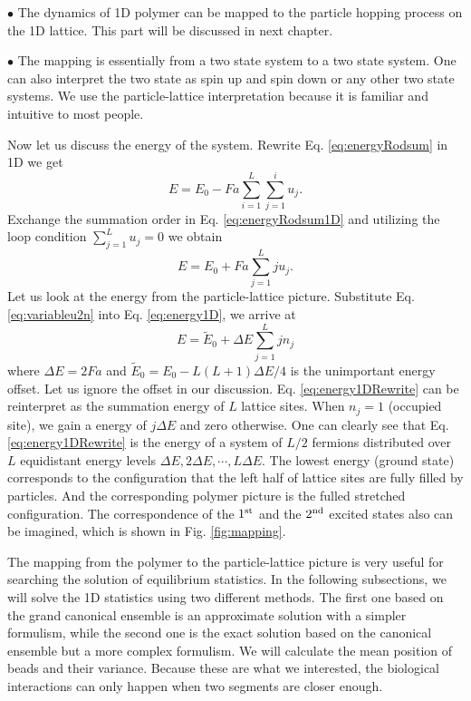 $\bullet$ The dynamics of 1D polymer can be mapped to the particle hopping process on the 1D lattice. This part will be discussed in next chapter.

$\bullet$ The mapping is essentially from a two state system to a two state system. One can also interpret the two state as spin up and spin down or any other two state systems. We use the particle-lattice interpretation because it is familiar and intuitive to most people. 

Now let us discuss the energy of the system. Rewrite Eq. \eqref{eq:energyRodsum} in 1D we get
\begin{equation}
    \label{eq:energyRodsum1D}
    E = E_0 - Fa \sum_{i=1}^L\sum_{j=1}^i u_j.
\end{equation}
Exchange the summation order in Eq. \eqref{eq:energyRodsum1D} and utilizing the loop condition $\sum_{j=1}^L u_j = 0$ we obtain
\begin{equation}
    \label{eq:energy1D}
    E = E_0 + Fa \sum_{j=1}^L j u_j.
\end{equation}
Let us look at the energy from the particle-lattice picture. Substitute Eq. \eqref{eq:variableu2n} into Eq. \eqref{eq:energy1D}, we arrive at
\begin{equation}
    \label{eq:energy1DRewrite}
    E = \tilde{E}_0+\Delta E\sum_{j=1}^{L} j n_j 
\end{equation}
where $\Delta E = 2Fa$ and $\tilde{E}_0 = E_0 - L(L+1)\Delta E/4$ is the unimportant energy offset. Let us ignore the offset in our discussion. Eq. \eqref{eq:energy1DRewrite} can be reinterpret as the summation energy of $L$ lattice sites. When $n_j = 1$ (occupied site), we gain a energy of $j\Delta E$ and zero otherwise. One can clearly see that Eq. \eqref{eq:energy1DRewrite} is the energy of a system of $L/2$ fermions distributed over $L$ equidistant energy levels $\Delta E, 2\Delta E, \cdots, L\Delta E$.
The lowest energy (ground state) corresponds to the configuration that the left half of lattice sites are fully filled by particles. And the corresponding polymer picture is the fulled stretched configuration. The correspondence of the $1^{\rm{st}}$ and the $2^{\rm{nd}}$ excited states also can be imagined, which is shown in Fig. \ref{fig:mapping}. 

The mapping from the polymer to the particle-lattice picture is very useful for searching the solution of equilibrium statistics. In the following subsections, we will solve the 1D statistics using two different methods. The first one based on the grand canonical ensemble is an approximate solution with a simpler formulism, while the second one is the exact solution based on the canonical ensemble but a more complex formulism. We will calculate the mean position of beads and their variance. Because these are what we interested, the biological interactions can only happen when two segments are closer enough. 

